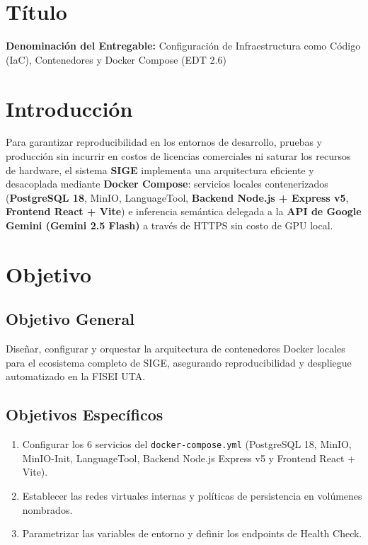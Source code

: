 \documentclass[12pt,a4paper]{article}
\begin{document}
\section{Título}
\textbf{Denominación del Entregable:} Configuración de Infraestructura como Código (IaC), Contenedores y Docker Compose (EDT 2.6)



\section{Introducción}
Para garantizar reproducibilidad en los entornos de desarrollo, pruebas y producción sin incurrir en costos de licencias comerciales ni saturar los recursos de hardware, el sistema \textbf{SIGE} implementa una arquitectura eficiente y desacoplada mediante \textbf{Docker Compose}: servicios locales contenerizados (\textbf{PostgreSQL 18}, MinIO, LanguageTool, \textbf{Backend Node.js + Express v5}, \textbf{Frontend React + Vite}) e inferencia semántica delegada a la \textbf{API de Google Gemini (Gemini 2.5 Flash)} a través de HTTPS sin costo de GPU local.

\section{Objetivo}

\subsection{Objetivo General}
Diseñar, configurar y orquestar la arquitectura de contenedores Docker locales para el ecosistema completo de SIGE, asegurando reproducibilidad y despliegue automatizado en la FISEI UTA.

\subsection{Objetivos Específicos}
\begin{enumerate}[leftmargin=1.5em, itemsep=2pt, topsep=2pt]
    \item Configurar los 6 servicios del \texttt{docker-compose.yml} (PostgreSQL 18, MinIO, MinIO-Init, LanguageTool, Backend Node.js Express v5 y Frontend React + Vite).
    \item Establecer las redes virtuales internas y políticas de persistencia en volúmenes nombrados.
    \item Parametrizar las variables de entorno y definir los endpoints de Health Check.
\end{enumerate}
\end{document}
